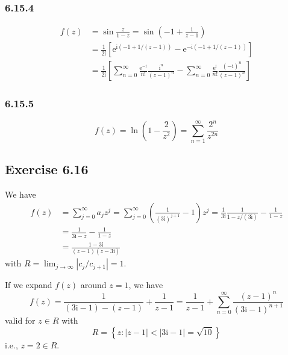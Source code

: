 \documentclass[]{ctexart}
\begin{document}
	\subsubsection*{6.15.4}
	\begin{equation*}
	\begin{split}
	f(z)&=\sin\frac{z}{1-z}=\sin\left(-1+\frac{1}{z-1}\right)\\
	&=\frac{1}{2\mathrm{i}}\left[\mathrm{e}^{\mathrm{i}(-1+1/(z-1))}-\mathrm{e}^{-\mathrm{i}(-1+1/(z-1))}\right]\\
	&=\frac{1}{2\mathrm{i}}\left[\sum_{n=0}^\infty\frac{\mathrm e^{-\mathrm{i}}}{n!}\frac{\mathrm{i}^n}{(z-1)^n}-\sum_{n=0}^\infty\frac{\mathrm{e}^{\mathrm{i}}}{n!}\frac{(-\mathrm{i})^n}{(z-1)^n}\right]
	\end{split}
	\end{equation*}
	\subsubsection*{6.15.5}
	\begin{equation*}
	f(z)=\ln\left(1-\frac{2}{z^2}\right)=\sum_{n=1}^\infty\frac{2^n}{z^{2n}}
	\end{equation*}
	\subsection{Exercise 6.16}
	We have 
	\begin{equation*}
	\begin{split}
	f(z)&=\sum_{j=0}^\infty a_j z^j=\sum_{j=0}^\infty\left(\frac{1}{(3\mathrm{i})^{j+1}}-1\right)z^j=\frac{1}{3\mathrm{i}}\frac{1}{1-z/(3\mathrm{i})}-\frac 1{1-z}\\
	&=\frac{1}{3\mathrm{i}-z}-\frac{1}{1-z}\\
	&=\frac{1-3\mathrm{i}}{(z-1)(z-3\mathrm{i})}
	\end{split}
	\end{equation*}
	with $R=\lim_{j\to\infty}|c_j/c_{j+1}|=1$. 
	
	If we expand $f(z)$ around $z=1$, we have 
	\begin{equation*}
	f(z)=\frac{1}{(3\mathrm{i}-1)-(z-1)}+\frac{1}{z-1}=\frac{1}{z-1}+\sum_{n=0}^\infty\frac{(z-1)^n}{(3\mathrm{i}-1)^{n+1}}
	\end{equation*}
	valid for $z\in R$ with
	\begin{equation*}
	R=\left\{z:|z-1|<|3\mathrm{i}-1|=\sqrt{10}\right\}
	\end{equation*}
	i.e., $z=2\in R$. 
\end{document}
